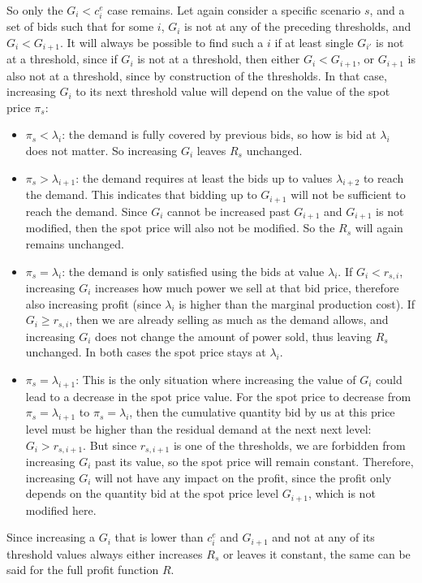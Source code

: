 \documentclass[12pt]{article}
\begin{document}
So only the $G_i < c^e_i$ case remains.
Let again consider a specific scenario $s$, and a set of
bids such that for some $i$, $G_i$ is not at any of the preceding thresholds,
and $G_i < G_{i+1}$. It will always be possible to find such a $i$ if at
least single $G_{i'}$ is not at a threshold, since if $G_i$ is not at a
threshold, then either $G_i < G_{i+1}$, or $G_{i+1}$ is also not at a
threshold, since by construction of the thresholds. In that case, increasing
$G_i$ to its next threshold value will depend on the value of the spot price
$\pi_s$:
\begin{itemize}
\item $\pi_s < \lambda_i$: the demand is fully covered by previous bids, so
how is bid at $\lambda_i$ does not matter. So increasing $G_i$ leaves
$R_s$ unchanged.
\item $\pi_s > \lambda_{i+1}$: the demand requires at least the bids up to
values $\lambda_{i+2}$ to reach the demand. This indicates that bidding up
to $G_{i+1}$ will not be sufficient to reach the demand. Since $G_i$ cannot
be increased past $G_{i+1}$ and $G_{i+1}$ is not modified,
then the spot price will also not be modified. So the $R_s$ will again remains
unchanged.
\item $\pi_s = \lambda_i$: the demand is only satisfied using the bids at
value $\lambda_i$. If $G_i < r_{s,i}$, increasing $G_i$ increases how much
power we sell at that bid price, therefore also increasing profit
(since $\lambda_i$ is higher than the marginal production cost).
If $G_i \ge r_{s,i}$, then we are already selling as much as the demand
allows, and increasing $G_i$ does not change the amount of power sold, thus
leaving $R_s$ unchanged. In both cases the spot price stays at $\lambda_i$.
\item $\pi_s = \lambda_{i+1}$: This is the only situation where increasing
the value of $G_i$ could lead to a decrease in the spot price value. For
the spot price to decrease from $\pi_s = \lambda_{i+1}$ to
$\pi_s = \lambda_i$, then the cumulative quantity bid by us at this price
level must be higher than the residual demand at the next next level:
$G_i > r_{s,i+1}$. But since $r_{s,i+1}$ is one of the thresholds, we are
forbidden from increasing $G_i$ past its value, so the spot price will remain
constant. Therefore, increasing $G_i$ will not have any impact on the profit,
since the profit only depends on the quantity bid at the spot price level
$G_{i+1}$, which is not modified here.
\end{itemize}
Since increasing a $G_i$ that is lower than $c^e_i$ and $G_{i+1}$ and not
at any of its threshold values always either increases $R_s$ or leaves it
constant, the same can be said for the full profit function $R$.
\end{document}
